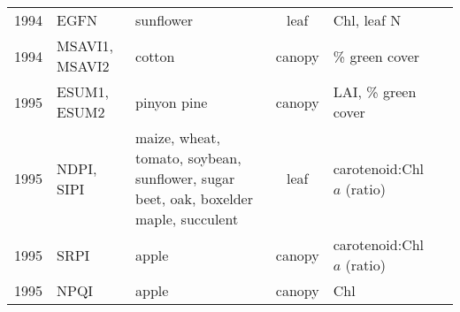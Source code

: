\documentclass[10pt]{article}
\begin{document}
{\begin{ThreePartTable}
\begin{longtable}{c M{1.5in} M{2.5in} c M{1.5in} M{1.5in}}
  1994 & EGFN                                            & sunflower                                                                                                                                                                                                                                             & leaf         & Chl, leaf N                                                                              & \citet{Penuelas1994}                                \\
  1994 & MSAVI1, MSAVI2                                  & cotton                                                                                                                                                                                                                                                & canopy       & \% green cover                                                                           & \citet{Qi1994}                                      \\
  1995 & ESUM1, ESUM2                                    & pinyon pine                                                                                                                                                                                                                                           & canopy       & LAI, \% green cover                                                                      & \citet{Elvidge1995}                                 \\
  1995 & NDPI, SIPI                                      & maize, wheat, tomato, soybean, sunflower, sugar beet, oak, boxelder maple, succulent                                                                                                                                                                  & leaf         & carotenoid:Chl $a$ (ratio)                                                               & \citet{Penuelas1995a}                               \\
  1995 & SRPI                                            & apple                                                                                                                                                                                                                                                 & canopy       & carotenoid:Chl $a$ (ratio)                                                               & \citet{Penuelas1995b}                               \\
  1995 & NPQI                                            & apple                                                                                                                                                                                                                                                 & canopy       & Chl                                                                                      & \citet{Penuelas1995b}                               \\

\end{longtable}
\end{ThreePartTable}}
\end{document}
